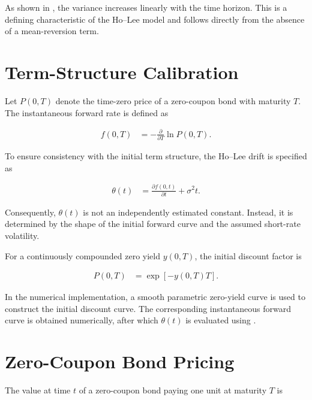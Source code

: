 \documentclass[11pt,a4paper]{article}
\numberwithin{equation}{section}
\begin{document}
As shown in , the variance increases linearly
with the time horizon. This is a defining characteristic of the Ho--Lee
model and follows directly from the absence of a mean-reversion term.


\section{Term-Structure Calibration}

Let $P(0,T)$ denote the time-zero price of a zero-coupon bond with
maturity $T$. The instantaneous forward rate is defined as

\begin{align*}
    f(0,T)
    &=
    -\frac{\partial}{\partial T}
    \ln P(0,T).
\end{align*}

To ensure consistency with the initial term structure, the Ho--Lee drift
is specified as

\begin{align}
    \theta(t)
    &=
    \frac{\partial f(0,t)}{\partial t}
    +
    \sigma^2t.
    \label{eq:ho_lee_theta}
\end{align}

Consequently, $\theta(t)$ is not an independently estimated constant.
Instead, it is determined by the shape of the initial forward curve and
the assumed short-rate volatility.

For a continuously compounded zero yield $y(0,T)$, the initial discount
factor is

\begin{align*}
    P(0,T)
    &=
    \exp\left[-y(0,T)T\right].
\end{align*}

In the numerical implementation, a smooth parametric zero-yield curve is
used to construct the initial discount curve. The corresponding
instantaneous forward curve is obtained numerically, after which
$\theta(t)$ is evaluated using .


\section{Zero-Coupon Bond Pricing}

The value at time $t$ of a zero-coupon bond paying one unit at maturity
$T$ is
\end{document}

